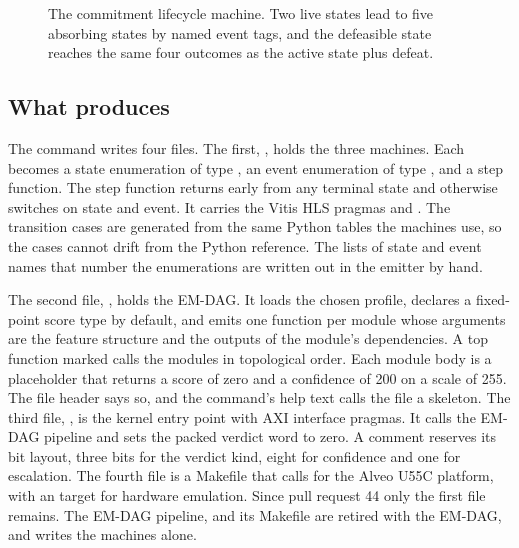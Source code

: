 \begin{figure}[t]
\centering

\caption{The commitment lifecycle machine. Two live states lead to five absorbing states by named
event tags, and the defeasible state reaches the same four outcomes as the active state plus
defeat.}
\label{fig:compiler-commitment-fsm}
\end{figure}

\subsection{What  produces}

The command  writes four files. The first,
, holds the three machines. Each becomes a state enumeration of type
, an event enumeration of type , and a step function. The step
function returns early from any terminal state and otherwise switches on state and event. It
carries the Vitis HLS pragmas  and . The transition cases are
generated from the same Python tables the machines use, so the cases cannot drift from the Python
reference. The lists of state and event names that number the enumerations are written out in the
emitter by hand.

The second file, , holds the EM-DAG. It loads the chosen profile,
declares a fixed-point score type  by default, and emits one function per
module whose arguments are the feature structure and the outputs of the module's dependencies. A
top function marked  calls the modules in topological order. Each module body is a
placeholder that returns a score of zero and a confidence of 200 on a scale of 255. The file
header says so, and the command's help text calls the file a skeleton. The third file,
, is the kernel entry point with AXI interface pragmas. It calls the EM-DAG
pipeline and sets the packed verdict word to zero. A comment reserves its bit layout, three bits
for the verdict kind, eight for confidence and one for escalation. The fourth file is a Makefile
that calls  for the Alveo U55C platform, with an  target for hardware
emulation.
Since pull request 44 only the first file remains. The EM-DAG pipeline,
 and its Makefile are retired with the EM-DAG, and 
writes the machines alone.


